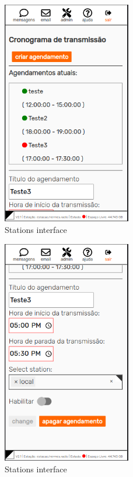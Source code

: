 \documentclass[11pt,a4paper]{article}
\begin{document}
\begin{figure}[H]
    \centering
    \includegraphics[width=0.5\textwidth]{screenshots/frontend/pt_kn/central.png}
    \caption{Stations interface}
	\vspace{-10pt}
    \label{fig:central}
\end{figure} 

\begin{figure}[H]
    \centering
    \includegraphics[width=0.5\textwidth]{screenshots/frontend/pt_kn/central2.png}
    \caption{Stations interface}
	\vspace{-10pt}
    \label{fig:central2}
\end{figure}
\end{document}
